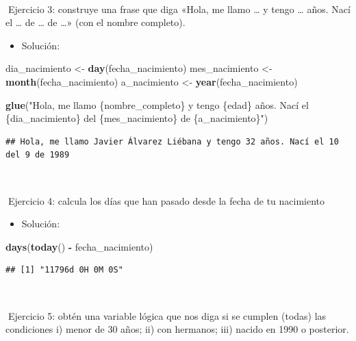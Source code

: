 \documentclass[11pt,]{book}
\newenvironment{Shaded}{\begin{snugshade}}{\end{snugshade}}
\newcommand{\KeywordTok}[1]{\textcolor[rgb]{0.27,0.27,0.27}{\textbf{#1}}}
\newcommand{\NormalTok}[1]{#1}
\newcommand{\OperatorTok}[1]{\textcolor[rgb]{0.43,0.43,0.43}{\textbf{#1}}}
\newcommand{\StringTok}[1]{\textcolor[rgb]{0.5,0.5,0.5}{#1}}
\providecommand{\tightlist}{%
  \setlength{\itemsep}{0pt}\setlength{\parskip}{0pt}}
\begin{document}
~

📝Ejercicio 3: construye una frase que diga «Hola, me llamo \ldots{} y tengo \ldots{} años. Nací el \ldots{} de \ldots{} de \ldots{}» (con el nombre completo).

\begin{itemize}
\tightlist
\item
  Solución:
\end{itemize}

\begin{Shaded}
\begin{Highlighting}[]
\NormalTok{dia_nacimiento <-}\StringTok{ }\KeywordTok{day}\NormalTok{(fecha_nacimiento)}
\NormalTok{mes_nacimiento <-}\StringTok{ }\KeywordTok{month}\NormalTok{(fecha_nacimiento)}
\NormalTok{a_nacimiento <-}\StringTok{ }\KeywordTok{year}\NormalTok{(fecha_nacimiento)}

\KeywordTok{glue}\NormalTok{(}\StringTok{"Hola, me llamo \{nombre_completo\} y tengo \{edad\} años. Nací el \{dia_nacimiento\} del \{mes_nacimiento\} de \{a_nacimiento\}"}\NormalTok{)}
\end{Highlighting}
\end{Shaded}

\begin{verbatim}
## Hola, me llamo Javier Álvarez Liébana y tengo 32 años. Nací el 10 del 9 de 1989
\end{verbatim}

~

📝Ejercicio 4: calcula los días que han pasado desde la fecha de tu nacimiento

\begin{itemize}
\tightlist
\item
  Solución:
\end{itemize}

\begin{Shaded}
\begin{Highlighting}[]
\KeywordTok{days}\NormalTok{(}\KeywordTok{today}\NormalTok{() }\OperatorTok{-}\StringTok{ }\NormalTok{fecha_nacimiento)}
\end{Highlighting}
\end{Shaded}

\begin{verbatim}
## [1] "11796d 0H 0M 0S"
\end{verbatim}

~

📝Ejercicio 5: obtén una variable lógica que nos diga si se cumplen (todas) las condiciones i) menor de 30 años; ii) con hermanos; iii) nacido en 1990 o posterior.
\end{document}
